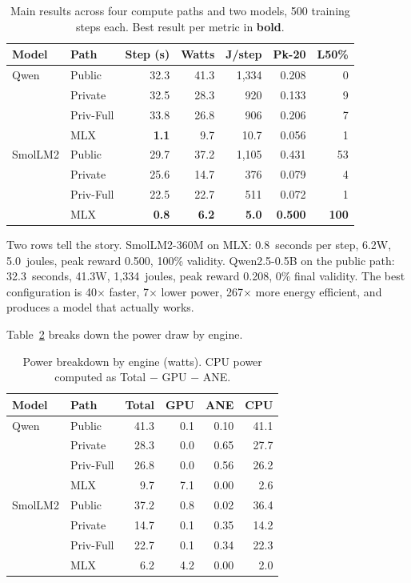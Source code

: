 \documentclass[11pt]{article}
\begin{document}
\begin{table}[t]
\centering
\caption{Main results across four compute paths and two models, 500 training steps each.  Best result per metric in \textbf{bold}.}
\label{tab:main}
\small
\begin{tabular}{llrrrrr}
\toprule
\textbf{Model} & \textbf{Path} & \textbf{Step (s)} & \textbf{Watts} & \textbf{J/step} & \textbf{Pk-20} & \textbf{L50\%} \\
\midrule
Qwen & Public & 32.3 & 41.3 & 1,334 & 0.208 & 0 \\
 & Private & 32.5 & 28.3 & 920 & 0.133 & 9 \\
 & Priv-Full & 33.8 & 26.8 & 906 & 0.206 & 7 \\
 & MLX & \textbf{1.1} & 9.7 & 10.7 & 0.056 & 1 \\
\midrule
SmolLM2 & Public & 29.7 & 37.2 & 1,105 & 0.431 & 53 \\
 & Private & 25.6 & 14.7 & 376 & 0.079 & 4 \\
 & Priv-Full & 22.5 & 22.7 & 511 & 0.072 & 1 \\
 & MLX & \textbf{0.8} & \textbf{6.2} & \textbf{5.0} & \textbf{0.500} & \textbf{100} \\
\bottomrule
\end{tabular}
\end{table}

Two rows tell the story.  SmolLM2-360M on MLX: 0.8~seconds per step, 6.2W, 5.0~joules, peak reward 0.500, 100\% validity.  Qwen2.5-0.5B on the public path: 32.3~seconds, 41.3W, 1,334~joules, peak reward 0.208, 0\% final validity.  The best configuration is 40$\times$ faster, 7$\times$ lower power, 267$\times$ more energy efficient, and produces a model that actually works.

Table~\ref{tab:power_detail} breaks down the power draw by engine.

\begin{table}[ht]
\centering
\caption{Power breakdown by engine (watts).  CPU power computed as Total $-$ GPU $-$ ANE.}
\label{tab:power_detail}
\small
\begin{tabular}{llrrrr}
\toprule
\textbf{Model} & \textbf{Path} & \textbf{Total} & \textbf{GPU} & \textbf{ANE} & \textbf{CPU} \\
\midrule
Qwen & Public & 41.3 & 0.1 & 0.10 & 41.1 \\
 & Private & 28.3 & 0.0 & 0.65 & 27.7 \\
 & Priv-Full & 26.8 & 0.0 & 0.56 & 26.2 \\
 & MLX & 9.7 & 7.1 & 0.00 & 2.6 \\
\midrule
SmolLM2 & Public & 37.2 & 0.8 & 0.02 & 36.4 \\
 & Private & 14.7 & 0.1 & 0.35 & 14.2 \\
 & Priv-Full & 22.7 & 0.1 & 0.34 & 22.3 \\
 & MLX & 6.2 & 4.2 & 0.00 & 2.0 \\
\bottomrule
\end{tabular}
\end{table}
\end{document}
